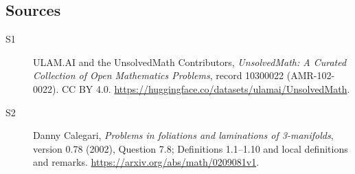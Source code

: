 \documentclass[11pt]{article}
\begin{document}
\subsection{Sources}
\begin{description}
\item[\hypertarget{source:10300022:1}{S1}] ULAM.AI and the UnsolvedMath Contributors, \emph{UnsolvedMath: A Curated Collection of Open Mathematics Problems}, record 10300022 (AMR-102-0022). CC BY 4.0. \url{https://huggingface.co/datasets/ulamai/UnsolvedMath}.
\item[\hypertarget{source:10300022:2}{S2}] Danny Calegari, \emph{Problems in foliations and laminations of 3-manifolds}, version 0.78 (2002), Question 7.8; Definitions 1.1--1.10 and local definitions and remarks. \url{https://arxiv.org/abs/math/0209081v1}.
\end{description}
\label{end:10300022}
\end{document}
